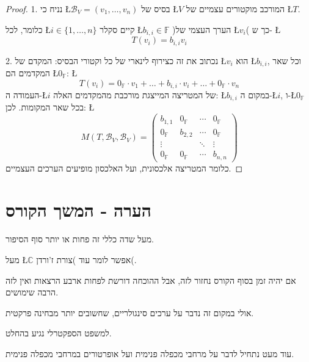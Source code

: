 \documentclass[english,hebrew]{article}
\begin{document}
\begin{proof}
1. נניח כי \L{$\mathcal{B}_{V}=(v_{1},\dots,v_{n})$} בסיס של \L{$V$}
המורכב מוקטורים עצמיים של \L{$T$}.

כלומר, לכל \L{$i\in\{1,\dots,n\}$} קיים סקלר \L{$b_{i,i}\in\mathbb{F}$}
)הערך העצמי של \L{$v_{i}$}( כך ש- \L{%
\[
T(v_{i})=b_{i,i}v_{i}
\]
}%

2. נכתוב את זה כצירוף לינארי של כל וקטורי הבסיס: המקדם של \L{$v_{i}$}
הוא \L{$b_{i,i}$}, וכל שאר המקדמים הם \L{$0_{\mathbb{F}}$}: \L{%
\[
T(v_{i})=0_{\mathbb{F}}\cdot v_{1}+\dots+b_{i,i}\cdot v_{i}+\dots+0_{\mathbb{F}}\cdot v_{n}
\]
}%
העמודה ה-\L{$i$} של המטריצה המייצגת מורכבת מהמקדמים האלה: \L{$b_{i,i}$}
במקום ה-\L{$i$}, ו-\L{$0_{\mathbb{F}}$} בכל שאר המקומות. לכן: \L{%
\[
M(T,\mathcal{B}_{V},\mathcal{B}_{V})=\begin{pmatrix}b_{1,1} & 0_{\mathbb{F}} & \cdots & 0_{\mathbb{F}}\\
0_{\mathbb{F}} & b_{2,2} & \cdots & 0_{\mathbb{F}}\\
\vdots &  & \ddots & \vdots\\
0_{\mathbb{F}} & 0_{\mathbb{F}} & \cdots & b_{n,n}
\end{pmatrix}
\]
}%
כלומר המטריצה אלכסונית, ועל האלכסון מופיעים הערכים העצמיים. 
\end{proof}

\section{הערה - המשך הקורס}

מעל שדה כללי זה פחות או יותר סוף הסיפור.

מעל \L{$\mathbb{C}$} אפשר לומר עוד )צורת ז'ורדן(.

אם יהיה זמן בסוף הקורס נחזור לזה, אבל ההוכחה דורשת לפחות ארבע הרצאות
ואין לזה הרבה שימושים.

אולי במקום זה נדבר על ערכים סינגולריים, שחשובים יותר מבחינה פרקטית.

למשפט הספקטרלי נגיע בהחלט.

עוד מעט נתחיל לדבר על מרחבי מכפלה פנימית ועל אופרטורים במרחבי מכפלה
פנימית.
\end{document}
